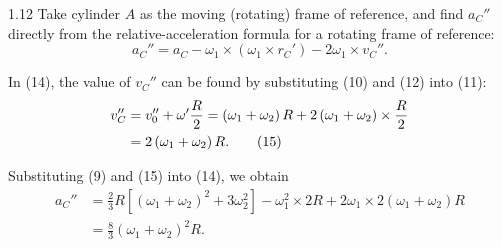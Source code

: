 \begin{solution}{1.12}
Take cylinder $A$ as the moving (rotating) frame of reference, and find $a_C''$ directly from
the relative-acceleration formula for a rotating frame of reference:
\begin{equation}
a_C'' = a_C-\omega_1\times\left(\omega_1\times r_C'\right)-2\omega_1\times v_C''. \tag{14}
\end{equation}

In (14), the value of $v_C''$ can be found by substituting (10) and (12) into (11):
\begin{align}
v_C'' &= v_0''+\omega'\frac{R}{2}
= \left(\omega_1+\omega_2\right)R+2\left(\omega_1+\omega_2\right)\times\frac{R}{2}\notag\\
&= 2\left(\omega_1+\omega_2\right)R. \tag{15}
\end{align}

Substituting (9) and (15) into (14), we obtain
\begin{align*}
a_C'' &= \frac{2}{3}R\left[\left(\omega_1+\omega_2\right)^2+3\omega_2^2\right]
-\omega_1^2\times 2R+2\omega_1\times 2\left(\omega_1+\omega_2\right)R\\
&= \frac{8}{3}\left(\omega_1+\omega_2\right)^2R.
\end{align*}
\end{solution}

